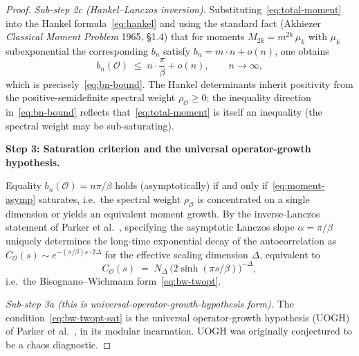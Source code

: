 \documentclass[12pt,a4paper]{article}
\begin{document}
\begin{proof}
\emph{Sub-step 2c (Hankel--Lanczos inversion).}
Substituting~\eqref{eq:total-moment} into the Hankel
formula~\eqref{eq:hankel} and using the standard fact (Akhiezer
\emph{Classical Moment Problem} 1965, \S 1.4) that for moments
$M_{2k} = m^{2k}\,\mu_k$ with $\mu_k$ subexponential the corresponding
$b_n$ satisfy $b_n = m\cdot n + o(n)$, one obtains
\begin{equation}
  b_n(\mathcal{O}) \;\le\; n\cdot \frac{\pi}{\beta} + o(n),
  \qquad n \to \infty,
\end{equation}
which is precisely~\eqref{eq:bn-bound}. The Hankel determinants
inherit positivity from the positive-semidefinite spectral weight
$\rho_\mathcal{O}\ge 0$; the inequality direction in~\eqref{eq:bn-bound}
reflects that~\eqref{eq:total-moment} is itself an inequality
(the spectral weight may be sub-saturating).

\medskip

\noindent\textbf{Step 3: Saturation criterion and the universal
operator-growth hypothesis.}

Equality $b_n(\mathcal{O}) = n\pi/\beta$ holds (asymptotically) if
and only if~\eqref{eq:moment-asymp} saturates, i.e.\ the spectral
weight $\rho_\mathcal{O}$ is concentrated on a single dimension or
yields an equivalent moment growth. By the inverse-Lanczos statement
of Parker et al.~\cite[Theorem 2 / inverse problem statement]{Parker2019},
specifying the asymptotic Lanczos slope $\alpha = \pi/\beta$ uniquely
determines the long-time exponential decay of the autocorrelation as
$C_\mathcal{O}(s) \sim e^{-(\pi/\beta) s\cdot 2\Delta}$ for the
effective scaling dimension $\Delta$, equivalent to
\begin{equation}
  C_\mathcal{O}(s)
  \;=\;
  N_\Delta\,\bigl(2\sinh(\pi s/\beta)\bigr)^{-\Delta},
  \label{eq:bw-twopt-sat}
\end{equation}
i.e.\ the Bisognano--Wichmann form~\eqref{eq:bw-twopt}.

\emph{Sub-step 3a (this is universal-operator-growth-hypothesis
form).} The condition~\eqref{eq:bw-twopt-sat} is the universal
operator-growth hypothesis (UOGH) of Parker et
al.~\cite{Parker2019}, in its modular incarnation. UOGH was originally
conjectured to be a chaos diagnostic.


\end{proof}
\end{document}
